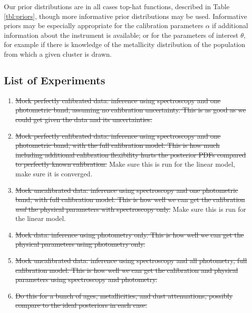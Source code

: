 \documentclass[iop,numberedappendix]{emulateapj}
\begin{document}
Our prior distributions are in all cases top-hat functions, described
in Table \ref{tbl:priors}, though more informative prior distributions
may be used.  Informative priors may be especially appropriate for the
calibration parameters $\alpha$ if additional information about the
instrument is available; or for the parameters of interest $\theta$,
for example if there is knowledge of the metallicity
distribution of the population from which a given cluster is drawn.



\subsection{List of Experiments}

\begin{enumerate}

\item \sout{Mock perfectly calibrated data: inference using spectroscopy and one
  photometric band, assuming no calibration uncertainty.  This is as
  good as we could get given the data and its uncertainties.}

\item \sout{Mock perfectly calibrated data: inference using
spectroscopy and one photometric band, with the full calibration
model.  This is how much including additional calibration flexibility
hurts the posterior PDFs compared to perfectly known calibration.}
Make sure this is run for the linear model, make sure it is converged.

\item \sout{Mock uncalibrated data:  inference using spectroscopy and one
  photometric band, with full calibration model.  This is how well we
  can get the calibration \emph{and} the physical parameters with
  spectroscopy only.}
Make sure this is run for the linear model.

\item \sout{Mock data: inference using photometry only.  This is how well we
  can get the physical parameters using photometry only.}

\item \sout{Mock uncalibrated data: inference using spectroscopy and all
  photometry, full calibration model.  This is how well we
  can get the calibration and physical parameters using spectroscopy
  and photometry.}

\item \sout{Do this for a bunch of ages, metallicities, and dust
  attenuations, possibly compare to the ideal posteriors in each case.}


\end{enumerate}
\end{document}
